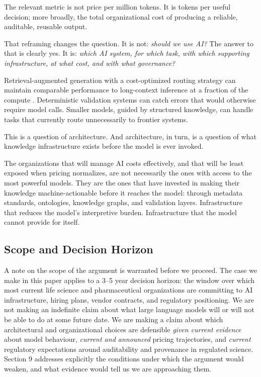 \documentclass[man,12pt,donotrepeattitle]{apa7}
\begin{document}
The relevant metric is not price per million tokens. It is tokens per
useful decision; more broadly, the total organizational cost of producing
a reliable, auditable, reusable output.

That reframing changes the question. It is not: \textit{should we use AI?}
The answer to that is clearly yes. It is: \textit{which AI system, for
which task, with which supporting infrastructure, at what cost, and with
what governance?}

Retrieval-augmented generation with a cost-optimized routing strategy can
maintain comparable performance to long-context inference at a fraction of
the compute \parencite{li2024}. Deterministic validation systems can catch
errors that would otherwise require model calls. Smaller models, guided by
structured knowledge, can handle tasks that currently route unnecessarily
to frontier systems.

This is a question of architecture. And architecture, in turn, is a
question of what knowledge infrastructure exists before the model is ever
invoked.

The organizations that will manage AI costs effectively, and that will be
least exposed when pricing normalizes, are not necessarily the ones with
access to the most powerful models. They are the ones that have invested in
making their knowledge machine-actionable before it reaches the model:
through metadata standards, ontologies, knowledge graphs, and validation
layers. Infrastructure that reduces the model's interpretive burden.
Infrastructure that the model cannot provide for itself.

\subsection{Scope and Decision Horizon}

A note on the scope of the argument is warranted before we proceed. The
case we make in this paper applies to a 3--5 year decision horizon: the
window over which most current life science and pharmaceutical organizations
are committing to AI infrastructure, hiring plans, vendor contracts, and
regulatory positioning. We are not making an indefinite claim about what
large language models will or will not be able to do at some future date.
We are making a claim about which architectural and organizational choices
are defensible \textit{given current evidence} about model behaviour,
\textit{current and announced} pricing trajectories, and \textit{current}
regulatory expectations around auditability and provenance in regulated
science. Section 9 addresses explicitly the conditions under which the
argument would weaken, and what evidence would tell us we are approaching
them.
\end{document}
